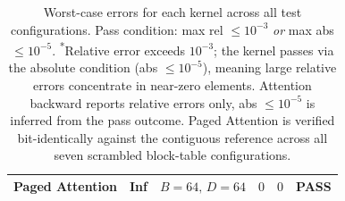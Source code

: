 \documentclass[11pt,letterpaper]{article}
\begin{document}
\begin{table}[h]
\begin{tabular}{@{}lllrrl@{}}
    Paged Attention              & Inf & $B{=}64,\,D{=}64$                  & $0$                      & $0$                                    & PASS \\
    \bottomrule
  \end{tabular}
  \caption{Worst-case errors for each kernel across all test configurations.
    Pass condition: max rel $\leq 10^{-3}$ \emph{or} max abs $\leq 10^{-5}$.
    \textsuperscript{*}Relative error exceeds $10^{-3}$; the kernel passes via the absolute
    condition (abs $\leq 10^{-5}$), meaning large relative errors concentrate in
    near-zero elements. Attention backward reports relative errors only,
    abs $\leq 10^{-5}$ is inferred from the pass outcome. Paged Attention is
    verified bit-identically against the contiguous reference across all seven
    scrambled block-table configurations.}
  \label{tab:errors}
\end{table}
\end{document}
